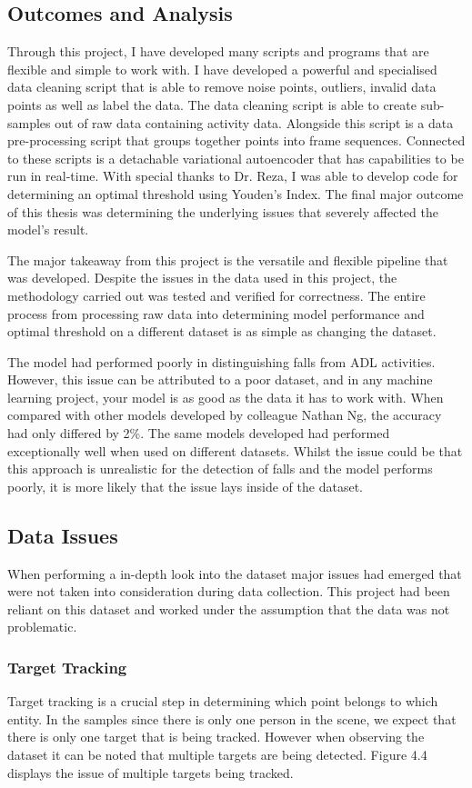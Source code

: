 \subsection{Outcomes and Analysis}
Through this project, I have developed many scripts and programs that are flexible and simple to work with. I have developed a powerful and specialised data cleaning script that is able to remove noise points, outliers, invalid data points as well as label the data. The data cleaning script is able to create sub-samples out of raw data containing activity data. Alongside this script is a data pre-processing script that groups together points into frame sequences. Connected to these scripts is a detachable variational autoencoder that has capabilities to be run in real-time. With special thanks to Dr. Reza, I was able to develop code for determining an optimal threshold using Youden's Index. The final major outcome of this thesis was determining the underlying issues that severely affected the model's result.

The major takeaway from this project is the versatile and flexible pipeline that was developed. Despite the issues in the data used in this project, the methodology carried out was tested and verified for correctness. The entire process from processing raw data into determining model performance and optimal threshold on a different dataset is as simple as changing the dataset.

The model had performed poorly in distinguishing falls from ADL activities. However, this issue can be attributed to a poor dataset, and in any machine learning project, your model is as good as the data it has to work with. When compared with other models developed by colleague Nathan Ng, the accuracy had only differed by 2\%. The same models developed had performed exceptionally well when used on different datasets. Whilst the issue could be that this approach is unrealistic for the detection of falls and the model performs poorly, it is more likely that the issue lays inside of the dataset.
\subsection{Data Issues}
When performing a in-depth look into the dataset major issues had emerged that were not taken into consideration during data collection. This project had been reliant on this dataset and worked under the assumption that the data was not problematic. 
\subsubsection{Target Tracking}
Target tracking is a crucial step in determining which point belongs to which entity. In the samples since there is only one person in the scene, we expect that there is only one target that is being tracked. However when observing the dataset it can be noted that multiple targets are being detected. Figure 4.4 displays the issue of multiple targets being tracked.

